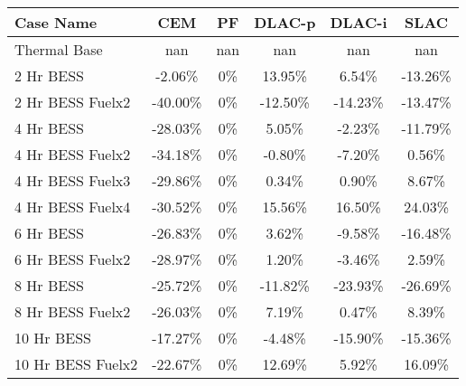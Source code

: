 \begin{tabular}{lccccc}
\toprule
Case Name & CEM & PF & DLAC-p & DLAC-i & SLAC \\
\midrule
Thermal Base & nan & nan & nan & nan & nan \\
2 Hr BESS & -2.06\% & 0\% & 13.95\% & 6.54\% & -13.26\% \\
2 Hr BESS Fuelx2 & -40.00\% & 0\% & -12.50\% & -14.23\% & -13.47\% \\
4 Hr BESS & -28.03\% & 0\% & 5.05\% & -2.23\% & -11.79\% \\
4 Hr BESS Fuelx2 & -34.18\% & 0\% & -0.80\% & -7.20\% & 0.56\% \\
4 Hr BESS Fuelx3 & -29.86\% & 0\% & 0.34\% & 0.90\% & 8.67\% \\
4 Hr BESS Fuelx4 & -30.52\% & 0\% & 15.56\% & 16.50\% & 24.03\% \\
6 Hr BESS & -26.83\% & 0\% & 3.62\% & -9.58\% & -16.48\% \\
6 Hr BESS Fuelx2 & -28.97\% & 0\% & 1.20\% & -3.46\% & 2.59\% \\
8 Hr BESS & -25.72\% & 0\% & -11.82\% & -23.93\% & -26.69\% \\
8 Hr BESS Fuelx2 & -26.03\% & 0\% & 7.19\% & 0.47\% & 8.39\% \\
10 Hr BESS & -17.27\% & 0\% & -4.48\% & -15.90\% & -15.36\% \\
10 Hr BESS Fuelx2 & -22.67\% & 0\% & 12.69\% & 5.92\% & 16.09\% \\
\bottomrule
\end{tabular}
